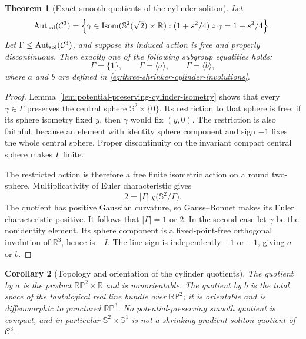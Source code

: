 \documentclass[10pt]{coll-l}
\newcommand{\Isom}{\operatorname{Isom}}
\newcommand{\R}{\mathbb{R}}
\newcommand{\Sph}{\mathbb{S}}
\newtheorem{theorem}{Theorem}[chapter]
\newtheorem{corollary}[theorem]{Corollary}
\theoremstyle{definition}
\theoremstyle{remark}
\numberwithin{section}{chapter}
\numberwithin{equation}{chapter}
\begin{document}
\begin{theorem}[Exact smooth quotients of the cylinder soliton]
\label{thm:exact-cylinder-soliton-quotients}
Let
\begin{equation}
 \operatorname{Aut}_{\rm sol}(\mathcal C^3)
  =\left\{\gamma\in\Isom(\Sph^2(\sqrt2)\times\R):
       (1+s^2/4)\circ\gamma=1+s^2/4\right\}.             \label{eq:cylinder-soliton-automorphism-group}
\end{equation}
Let $\Gamma\leq\operatorname{Aut}_{\rm sol}(\mathcal C^3)$, and suppose its induced
action is free and properly discontinuous.  Then exactly one of the
following subgroup equalities holds:
\begin{equation}
          \Gamma=\{1\},\qquad
          \Gamma=\langle a\rangle,\qquad
          \Gamma=\langle b\rangle,                       \label{eq:exact-cylinder-groups}
\end{equation}
where $a$ and $b$ are defined in
\eqref{eq:three-shrinker-cylinder-involutions}.
\end{theorem}

\begin{proof}
Lemma~\ref{lem:potential-preserving-cylinder-isometry} shows that every
$\gamma\in\Gamma$ preserves the central sphere
$\Sph^2\times\{0\}$.  Its restriction to that sphere is free: if its sphere
isometry fixed $y$, then $\gamma$ would fix $(y,0)$.  The restriction is
also faithful, because an element with identity sphere component and sign
$-1$ fixes the whole central sphere.  Proper discontinuity on the invariant
compact central sphere makes $\Gamma$ finite.

The restricted action is therefore a free finite isometric action on a
round two-sphere.  Multiplicativity of Euler characteristic gives
\[
            2=|\Gamma|\,
                \chi\bigl(\Sph^2/\Gamma\bigr).
\]
The quotient has positive Gaussian curvature, so Gauss--Bonnet makes its
Euler characteristic positive.  It follows that $|\Gamma|=1$ or $2$.
In the second case let $\gamma$ be the nonidentity element.  Its sphere
component is a fixed-point-free orthogonal involution of $\R^3$, hence is
$-I$.  The line sign is independently $+1$ or $-1$, giving $a$ or $b$.
\end{proof}

\begin{corollary}[Topology and orientation of the cylinder quotients]
\label{cor:cylinder-quotient-topology}
The quotient by $a$ is the product
$\mathbb{RP}^2\times\R$ and is nonorientable.  The quotient by $b$ is the
total space of the tautological real line bundle over $\mathbb{RP}^2$; it
is orientable and is diffeomorphic to punctured $\mathbb{RP}^3$.  No
potential-preserving smooth quotient is compact, and in particular
$\Sph^2\times\Sph^1$ is not a shrinking gradient soliton quotient of
$\mathcal C^3$.
\end{corollary}
\end{document}
